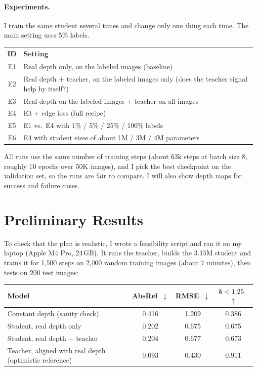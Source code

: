 \documentclass[11pt]{article}
\begin{document}
\paragraph{Experiments.} I train the same student several times and change
only one thing each time. The main setting uses 5\% labels.

\begin{center}
\small
\begin{tabular}{@{}cl@{}}
\toprule
\textbf{ID} & \textbf{Setting} \\
\midrule
E1 & Real depth only, on the labeled images (baseline) \\
E2 & Real depth + teacher, on the labeled images only (does the teacher signal help by itself?) \\
E3 & Real depth on the labeled images + teacher on all images \\
E4 & E3 + edge loss (full recipe) \\
E5 & E1 vs.\ E4 with 1\% / 5\% / 25\% / 100\% labels \\
E6 & E4 with student sizes of about 1M / 3M / 4M parameters \\
\bottomrule
\end{tabular}
\end{center}

All runs use the same number of training steps (about 63k steps at batch size
8, roughly 10 epochs over 50K images), and I pick the best checkpoint on the
validation set, so the runs are fair to compare. I will also show depth maps
for success and failure cases.

\section{Preliminary Results}
\label{sec:prelim}

To check that the plan is realistic, I wrote a feasibility script and ran it on
my laptop (Apple M4 Pro, 24\,GB). It runs the teacher, builds the 3.15M student
and trains it for 1,500 steps on 2,000 random training images (about 7
minutes), then tests on 200 test images:

\begin{center}
\small
\begin{tabular}{@{}lccc@{}}
\toprule
\textbf{Model} & \textbf{AbsRel}~$\downarrow$ & \textbf{RMSE}~$\downarrow$ & $\boldsymbol{\delta<1.25}$~$\uparrow$ \\
\midrule
Constant depth (sanity check) & 0.416 & 1.209 & 0.386 \\
Student, real depth only      & 0.202 & 0.675 & 0.675 \\
Student, real depth + teacher & 0.204 & 0.677 & 0.673 \\
Teacher, aligned with real depth (optimistic reference) & 0.093 & 0.430 & 0.911 \\
\bottomrule
\end{tabular}
\end{center}
\end{document}
